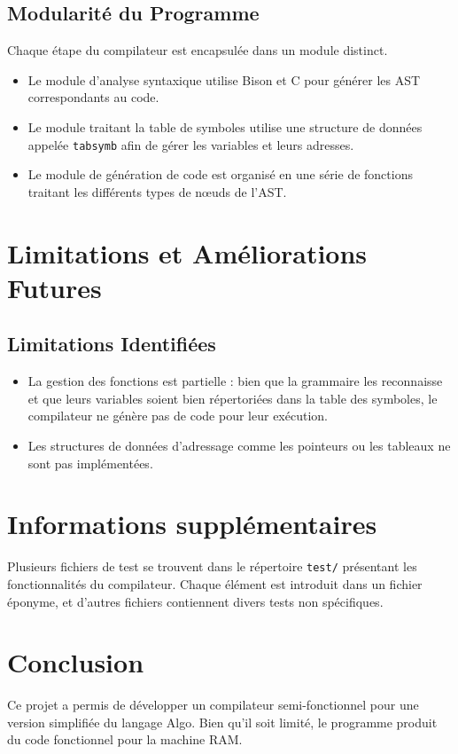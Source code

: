 \documentclass[a4paper,12pt]{article}
\begin{document}
\subsection{Modularité du Programme}
Chaque étape du compilateur est encapsulée dans un module distinct. 
\begin{itemize}
    \item Le module d'analyse syntaxique utilise Bison et C pour générer les AST correspondants au code.
    \item Le module traitant la table de symboles utilise une structure de données appelée \texttt{tabsymb} afin de gérer les variables et leurs adresses.
    \item Le module de génération de code est organisé en une série de fonctions traitant les différents types de nœuds de l'AST.
\end{itemize}


\section{Limitations et Améliorations Futures}

\subsection{Limitations Identifiées}
\begin{itemize}
    \item La gestion des fonctions est partielle : bien que la grammaire les reconnaisse et que leurs variables soient bien répertoriées dans la table des symboles, le compilateur ne génère pas de code pour leur exécution.
    \item Les structures de données d'adressage comme les pointeurs ou les tableaux ne sont pas implémentées.
\end{itemize}

\section{Informations supplémentaires}
Plusieurs fichiers de test se trouvent dans le répertoire \texttt{test/} présentant les fonctionnalités du compilateur. Chaque élément est introduit dans un fichier éponyme, et d'autres fichiers contiennent divers tests non spécifiques. 

\section{Conclusion}
Ce projet a permis de développer un compilateur semi-fonctionnel pour une version simplifiée du langage Algo. Bien qu'il soit limité, le programme produit du code fonctionnel pour la machine RAM.
\end{document}
